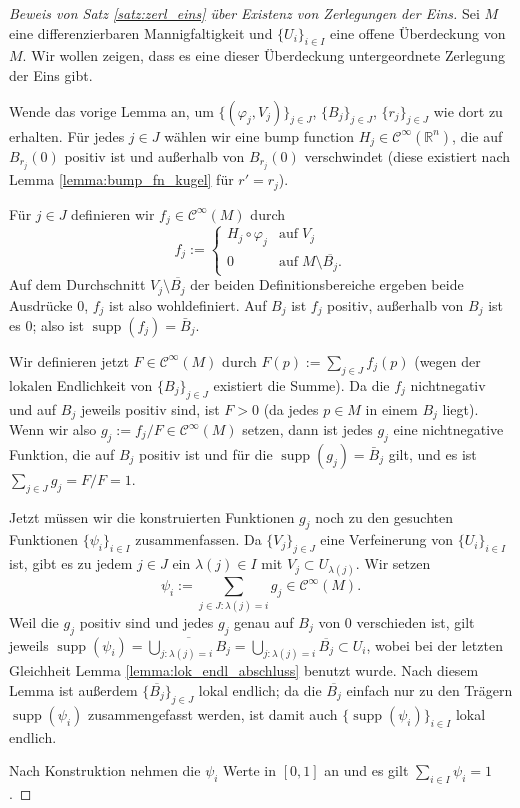 \documentclass[a4paper]{scrreprt}
\numberwithin{equation}{chapter}
\DeclareMathOperator{\supp}{supp}
\newcommand{\R}{\mathbb{R}}
\newcommand{\sC}{\mathcal{C}^{\infty}}
\theoremstyle{definition}
\begin{document}
\begin{proof}[Beweis von Satz \ref{satz:zerl_eins} über Existenz von Zerlegungen der Eins]
	Sei $M$ eine differenzierbaren Mannigfaltigkeit und $\{U_i\}_{i\in I}$ eine offene Überdeckung von $M$. Wir wollen zeigen, dass es eine dieser Überdeckung untergeordnete Zerlegung der Eins gibt.

	Wende das vorige Lemma an, um $\{(\varphi_j,V_j)\}_{j\in J}$, $\{B_j\}_{j\in J}$, $\{r_j\}_{j\in J}$ wie dort zu erhalten. Für jedes $j\in J$ wählen wir eine bump function $H_j \in \sC(\R^n)$, die auf $B_{r_j}(0)$ positiv ist und außerhalb von $B_{r_j}(0)$ verschwindet (diese existiert nach Lemma \ref{lemma:bump_fn_kugel} für $r' = r_j$).

	Für $j\in J$ definieren wir $f_j \in \sC(M)$ durch
	\[f_j := \begin{cases}
	H_j \circ \varphi_j & \text{auf} \; V_j\\
	0 & \text{auf} \; M \setminus \overline{B_j}.
	\end{cases}\]
	Auf dem Durchschnitt $V_j \setminus \overline{B_j}$ der beiden Definitionsbereiche ergeben beide Ausdrücke 0, $f_j$ ist also wohldefiniert. Auf $B_j$ ist $f_j$ positiv, außerhalb von $B_j$ ist es 0; also ist $\supp(f_j) = \bar B_j$.

	Wir definieren jetzt $F \in \sC(M)$ durch $F(p) := \sum_{j\in J} f_j(p)$ (wegen der lokalen Endlichkeit von $\{B_j\}_{j\in J}$ existiert die Summe). Da die $f_j$ nichtnegativ und auf $B_j$  jeweils positiv sind, ist $F > 0$ (da jedes $p\in M$ in einem $B_j$ liegt). Wenn wir also $g_j := f_j / F \in \sC(M)$ setzen, dann ist jedes $g_j$ eine nichtnegative Funktion, die auf $B_j$ positiv ist und für die $\supp(g_j) = \bar B_j$ gilt, und es ist $\sum_{j \in J} g_j = F/F = 1$.

	Jetzt müssen wir die konstruierten Funktionen $g_j$ noch zu den gesuchten Funktionen $\{\psi_i\}_{i\in I}$ zusammenfassen. Da $\{V_j\}_{j\in J}$ eine Verfeinerung von $\{U_i\}_{i\in I}$ ist, gibt es zu jedem $j \in J$ ein $\lambda(j) \in I$ mit $V_j \subset U_{\lambda(j)}$. Wir setzen
	\[\psi_i := \sum_{j\in J: \lambda(j) = i} g_j \in \sC(M).\]
	Weil die $g_j$ positiv sind und jedes $g_j$ genau auf $B_j$ von 0 verschieden ist, gilt jeweils $\supp(\psi_i) = \overline{\bigcup_{j: \lambda(j) = i} B_j} = \bigcup_{j: \lambda(j) = i} \overline{B_j} \subset U_i$, wobei bei der letzten Gleichheit Lemma \ref{lemma:lok_endl_abschluss} benutzt wurde. Nach diesem Lemma ist außerdem $\{\overline{B_j}\}_{j\in J}$ lokal endlich; da die $\overline{B_j}$ einfach nur zu den Trägern $\supp(\psi_i)$ \glqq zusammengefasst werden\grqq, ist damit auch $\{\supp(\psi_i)\}_{i\in I}$ lokal endlich.

	Nach Konstruktion nehmen die $\psi_i$ Werte in $[0,1]$ an und es gilt $\sum_{i\in I} \psi_i = 1$.
\end{proof}
\end{document}
